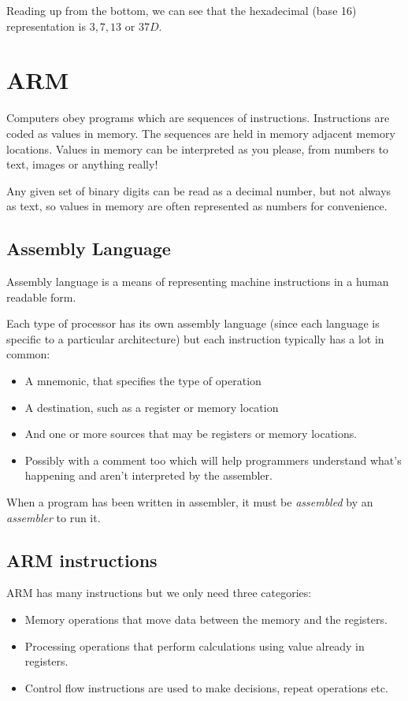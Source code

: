 Reading up from the bottom, we can see that the hexadecimal (base 16)
representation is $3,7,13$ or $37D$.


\section{ARM}

Computers obey programs which are sequences of instructions. Instructions are
coded as values in memory. The sequences are held in memory adjacent memory
locations. Values in memory can be interpreted as you please, from numbers to
text, images or anything really!

Any given set of binary digits can be read as a decimal number, but not always
as text, so values in memory are often represented as numbers for convenience.

\subsection{Assembly Language}

Assembly language is a means of representing machine instructions in a human
readable form.

Each type of processor has its own assembly language (since each language is
specific to a particular architecture) but each instruction typically has a lot
in common:

\begin{itemize}
	\item A mnemonic, that specifies the type of operation
	\item A destination, such as a register or memory location
	\item And one or more sources that may be registers or memory locations.
	\item Possibly with a comment too which will help programmers understand 
	what's happening and aren't interpreted by the assembler.
\end{itemize}

When a program has been written in assembler, it must be {\it assembled} by an
{\it assembler} to run it.

\subsection{ARM instructions}

ARM has many instructions but we only need three categories:

\begin{itemize}
	\item Memory operations that move data between the memory and the registers.
	\item Processing operations that perform calculations using value already in
	registers.
	\item Control flow instructions are used to make decisions, repeat 
	operations etc.
\end{itemize}

